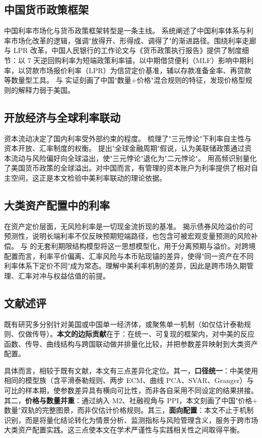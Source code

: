 \documentclass[12pt,a4paper]{ctexart}
\renewcommand{\citet}[1]{\citep{#1}}
\begin{document}
\subsection{中国货币政策框架}
中国利率市场化与货币政策框架转型是一条主线。\citet{yigang2021} 系统阐述了中国利率体系与利率市场化改革的逻辑，强调"放得开、形得成、调得了"的渐进路径。围绕利率走廊与 LPR 改革，中国人民银行的工作论文与《货币政策执行报告》提供了制度细节：以 7 天逆回购利率为短端政策利率锚，以中期借贷便利（MLF）影响中期利率，以贷款市场报价利率（LPR）为信贷定价基准，辅以存款准备金率、再贷款等数量型工具。\citet{chen2018} 与 \citet{girardin2017} 实证刻画了中国"数量+价格"混合规则的特征，发现价格型规则的解释力弱于美国。

\subsection{开放经济与全球利率联动}
资本流动决定了国内利率受外部约束的程度。\citet{obstfeld2004} 梳理了"三元悖论"下利率自主性与资本开放、汇率制度的权衡。\citet{rey2015} 提出"全球金融周期"假说，认为美联储政策通过资本流动与风险偏好向全球溢出，使"三元悖论"退化为"二元悖论"。\citet{miranda2020} 用高频识别量化了美国货币政策的全球溢出。对中国而言，有管理的资本账户为利率提供了相对自主空间，这正是本文检验中美利率联动的理论依据。

\subsection{大类资产配置中的利率}
在资产定价层面，无风险利率是一切现金流折现的基准。\citet{cochrane2005} 揭示债券风险溢价的可预测性，说明长端利率不仅反映预期短端路径，也包含可被宏观变量预测的风险补偿。\citet{kim2005} 与 \citet{adrian2013} 的无套利期限结构模型将这一思想模型化，用于分离预期与溢价。对跨境配置而言，利率平价偏离、汇率风险与本币贴现锚的差异，使得"同一资产在不同利率体系下定价不同"成为常态。理解中美利率机制的差异，因此是跨市场久期管理、汇率对冲与权益估值的前提。

\subsection{文献述评}
既有研究多分别针对美国或中国单一经济体，或聚焦单一机制（如仅估计泰勒规则、仅做传导）。\textbf{本文的边际贡献}在于：在统一、可复现的框架内，对中美的反应函数、传导、曲线结构与跨国联动做并排量化比较，并把参数差异映射到大类资产配置。

具体而言，相较于既有文献，本文有三点差异化定位。其一，\textbf{口径统一}：中美使用相同的模型族（含平滑泰勒规则、两步 ECM、曲线 PCA、SVAR、Granger）与可比的样本期，使参数差异具有横向可比性，而非各自采用不同设定的结果拼接。其二，\textbf{价格与数量并重}：通过纳入 M2、社融视角与 PPI，本文刻画了中国"价格$+$数量"双轨的完整图景，而非仅估计价格规则。其三，\textbf{面向配置}：本文不止于机制识别，而是将量化结论转化为情景分析、监测指标与风险管理含义，服务于跨市场大类资产配置实践。这三点使本文在学术严谨性与实践相关性之间取得平衡。
\end{document}
